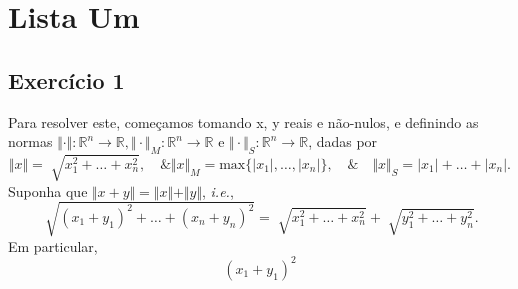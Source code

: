 \documentclass[../differential_geometry.tex]{subfiles}
\begin{document}
\section{Lista Um}
\subsection{Exercício 1}
Para resolver este, começamos tomando x, y reais e não-nulos, e definindo as
normas \(\Vert \cdot  \Vert :\mathbb{R}^{n}\rightarrow \mathbb{R}, \Vert \cdot  \Vert_{M}:\mathbb{R}^{n}\rightarrow \mathbb{R}\) e \(\Vert \cdot  \Vert_{S}:\mathbb{R}^{n}\rightarrow \mathbb{R}\), dadas 
por 
  \[
    \Vert x \Vert = \sqrt[]{x_{1}^{2}+\dotsc + x_{n}^{2}}, \quad\& \Vert x \Vert_{M} = \mathrm{max}\{|x_{1}|, \dotsc , |x_{n}|\}, \quad\&\quad \Vert x \Vert_{S} = |x_{1}| + \dotsc + |x_{n}|.
  \]
  Suponha que \(\Vert x + y \Vert = \Vert x \Vert + \Vert y \Vert\), \textit{i.e.}, 
    \[
      \sqrt[]{(x_{1}+y_{1})^{2} + \dotsc + (x_{n}+y_{n})^{2} } = \sqrt[]{x_{1}^{2} + \dotsc + x_{n}^{2}} + \sqrt[]{y_{1}^{2} + \dotsc + y_{n}^{2}}.
    \]
  Em particular, 
    \[
      (x_{1} + y_{1})^{2}
    \]
\end{document}
